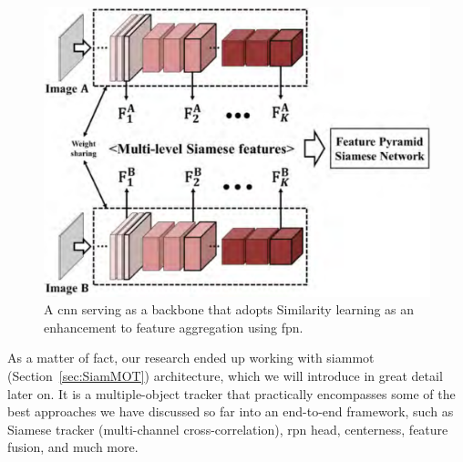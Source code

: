 \begin{figure}[!t]
    \centerline{\includegraphics[width=0.6\linewidth]{figures/theoretical_foundations/feature_pyramid_siamese_network.png}}
    \caption[\Gls{fpsn} architecture]{A \gls{cnn} serving as a backbone that adopts Similarity learning as an enhancement to feature aggregation using \gls{fpn}. }
    \label{fig:FeaturePyramidSiameseNetwork}
\end{figure}

As a matter of fact, our research ended up working with \gls{siammot}~\cite{shuai2021siammot} (Section~\ref{sec:SiamMOT}) architecture, which we will introduce in great detail later on. It is a multiple-object tracker that practically encompasses some of the best approaches we have discussed so far into an end-to-end framework, such as Siamese tracker (multi-channel cross-correlation), \gls{rpn} head, centerness, feature fusion, and much more.

